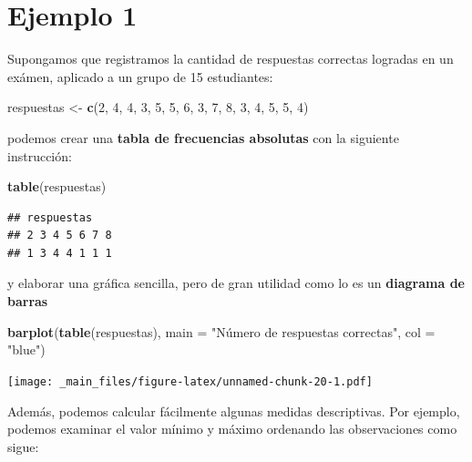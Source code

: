 \documentclass[
]{book}
\newenvironment{Shaded}{\begin{snugshade}}{\end{snugshade}}
\newcommand{\AttributeTok}[1]{\textcolor[rgb]{0.13,0.29,0.53}{#1}}
\newcommand{\DecValTok}[1]{\textcolor[rgb]{0.00,0.00,0.81}{#1}}
\newcommand{\FunctionTok}[1]{\textcolor[rgb]{0.13,0.29,0.53}{\textbf{#1}}}
\newcommand{\NormalTok}[1]{#1}
\newcommand{\OtherTok}[1]{\textcolor[rgb]{0.56,0.35,0.01}{#1}}
\newcommand{\StringTok}[1]{\textcolor[rgb]{0.31,0.60,0.02}{#1}}
\begin{document}
\hypertarget{ejemplo-1}{%
\section{Ejemplo 1}\label{ejemplo-1}}

Supongamos que registramos la cantidad de respuestas correctas logradas en un exámen, aplicado a un grupo de 15 estudiantes:

\begin{Shaded}
\begin{Highlighting}[]
\NormalTok{respuestas }\OtherTok{\textless{}{-}} \FunctionTok{c}\NormalTok{(}\DecValTok{2}\NormalTok{, }\DecValTok{4}\NormalTok{, }\DecValTok{4}\NormalTok{, }\DecValTok{3}\NormalTok{, }\DecValTok{5}\NormalTok{, }\DecValTok{5}\NormalTok{, }\DecValTok{6}\NormalTok{, }\DecValTok{3}\NormalTok{, }\DecValTok{7}\NormalTok{, }\DecValTok{8}\NormalTok{, }\DecValTok{3}\NormalTok{, }\DecValTok{4}\NormalTok{, }\DecValTok{5}\NormalTok{, }\DecValTok{5}\NormalTok{, }\DecValTok{4}\NormalTok{)}
\end{Highlighting}
\end{Shaded}

podemos crear una \textbf{tabla de frecuencias absolutas} con la siguiente instrucción:

\begin{Shaded}
\begin{Highlighting}[]
\FunctionTok{table}\NormalTok{(respuestas)}
\end{Highlighting}
\end{Shaded}

\begin{verbatim}
## respuestas
## 2 3 4 5 6 7 8 
## 1 3 4 4 1 1 1
\end{verbatim}

y elaborar una gráfica sencilla, pero de gran utilidad como lo es un \textbf{diagrama de barras}

\begin{Shaded}
\begin{Highlighting}[]
\FunctionTok{barplot}\NormalTok{(}\FunctionTok{table}\NormalTok{(respuestas), }
        \AttributeTok{main =} \StringTok{"Número de respuestas correctas"}\NormalTok{, }
        \AttributeTok{col =} \StringTok{"blue"}\NormalTok{)}
\end{Highlighting}
\end{Shaded}

\texttt{[image: \_main\_files/figure-latex/unnamed-chunk-20-1.pdf]}

Además, podemos calcular fácilmente algunas medidas descriptivas. Por ejemplo, podemos examinar el valor mínimo y máximo ordenando las observaciones como sigue:
\end{document}
